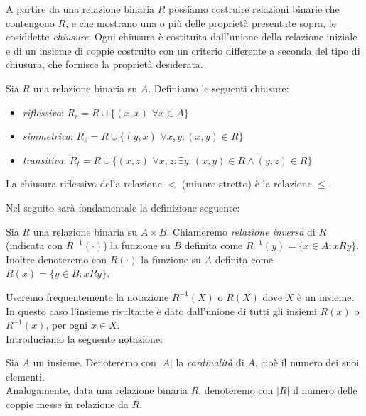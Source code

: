 A partire da una relazione binaria $R$ possiamo costruire relazioni binarie che contengono $R$, e che mostrano una o più delle proprietà presentate sopra, le cosiddette \emph{chiusure}.
Ogni chiusura è costituita dall'unione della relazione iniziale e di un insieme di coppie costruito con un criterio differente a seconda del tipo di chiusura, che fornisce la proprietà desiderata.
\begin{definition}
	Sia $R$ una relazione binaria su $A$.
    Definiamo le seguenti chiusure:
    \begin{itemize}
        \item \emph{riflessiva}: $R_r = R \cup \{(x,x) \,\, \forall x \in A\}$
        \item \emph{simmetrica}: $R_s = R \cup \{(y,x) \,\, \forall x,y : (x,y) \in R\}$
        \item \emph{transitiva}: $R_t = R \cup \{(x,z) \,\, \forall x,z : \exists y : (x,y) \in R \land (y,z) \in R\}$
    \end{itemize}
\end{definition}
\begin{example}
    La chiusura riflessiva della relazione $<$ (minore stretto) è la relazione $\leq$.
\end{example}
Nel seguito sarà fondamentale la definizione seguente:
\begin{definition}
    Sia $R$ una relazione binaria su $A \times B$. Chiameremo \emph{relazione inversa} di $R$ (indicata con $R^{-1}(\cdot)$) la funzione su $B$ definita come
    $R^{-1}(y) = \{x \in A : x R y\}$. Inoltre denoteremo con $R(\cdot)$ la funzione su $A$ definita come $R(x) = \{y \in B : x R y\}$.
\end{definition}
Useremo frequentemente la notazione $R^{-1}(X)$ o $R(X)$ dove $X$ è un insieme. In questo caso l'insieme risultante è dato dall'unione di tutti gli insiemi $R(x)$
o $R^{-1}(x)$, per ogni $x \in X$.\\
Introduciamo la seguente notazione:
\begin{definition}
    Sia $A$ un insieme. Denoteremo con $|A|$ la \emph{cardinalità} di $A$, cioè il numero dei suoi elementi.\\
    Analogamente, data una relazione binaria $R$, denoteremo con $|R|$ il numero delle coppie messe in relazione da $R$.
\end{definition}

